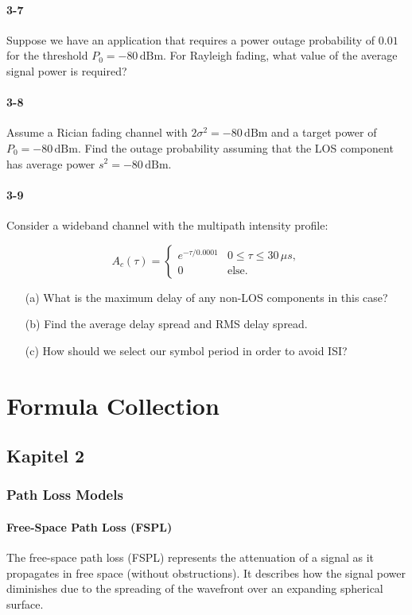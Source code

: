 \documentclass[a4paper,12pt]{book}
\begin{document}
	\subsection*{3-7}
	Suppose we have an application that requires a power outage probability of \( 0.01 \) for the threshold \( P_0 = -80 \, \text{dBm} \). For Rayleigh fading, what value of the average signal power is required?
	
	\subsection*{3-8}
	Assume a Rician fading channel with \( 2\sigma^2 = -80 \, \text{dBm} \) and a target power of \( P_0 = -80 \, \text{dBm} \). Find the outage probability assuming that the LOS component has average power \( s^2 = -80 \, \text{dBm} \).
	
	\subsection*{3-9}
	Consider a wideband channel with the multipath intensity profile:
	
	\[
	A_c(\tau) = 
	\begin{cases}
		e^{-\tau/0.0001} & 0 \leq \tau \leq 30 \, \mu s, \\
		0 & \text{else}.
	\end{cases}
	\]
	
	\begin{itemize}
		\item[(a)] What is the maximum delay of any non-LOS components in this case?
		\item[(b)] Find the average delay spread and RMS delay spread.
		\item[(c)] How should we select our symbol period in order to avoid ISI?
	\end{itemize}
	
	
	\part{Formula Collection}
	\chapter{Kapitel 2}
	\section{Path Loss Models}
	\subsection{Free-Space Path Loss (FSPL)}
	The free-space path loss (FSPL) represents the attenuation of a signal as it propagates in free space (without obstructions). It describes how the signal power diminishes due to the spreading of the wavefront over an expanding spherical surface.
	
\end{document}
